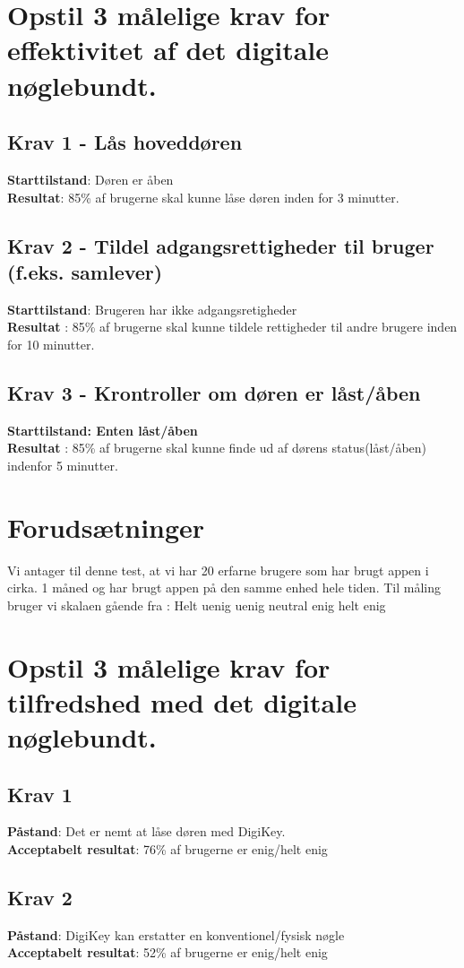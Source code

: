 \documentclass[12pt]{article}
\begin{document}
\section*{Opstil 3 målelige krav for effektivitet af det digitale nøglebundt.}
\subsection*{Krav 1 - Lås hoveddøren}
\textbf{Starttilstand}: Døren er åben\\
\textbf{Resultat}: 85\% af brugerne skal kunne låse døren inden for 3 minutter.
\subsection*{Krav 2 - Tildel adgangsrettigheder til bruger (f.eks. samlever)}
\textbf{Starttilstand}: Brugeren har ikke adgangsretigheder\\
\textbf{Resultat} : 85\% af brugerne skal kunne tildele rettigheder til andre brugere inden for 10 minutter.
\subsection*{Krav 3 - Krontroller om døren er låst/åben}
\textbf{Starttilstand: Enten l\aa st/\aa ben}\\
\textbf{Resultat} : 85\% af brugerne skal kunne finde ud af dørens status(låst/åben) indenfor 5 minutter.\newpage
\section*{Forudsætninger}
Vi antager til denne test, at vi har 20 erfarne brugere som har brugt appen i cirka. 1 måned og har brugt appen på den samme enhed hele tiden.
Til måling bruger vi skalaen gående fra : Helt uenig uenig neutral enig helt enig\\
\section*{Opstil 3 målelige krav for tilfredshed med det digitale nøglebundt.}
\subsection*{Krav 1}
\textbf{Påstand}: Det er nemt at låse døren med DigiKey.\\
\textbf{Acceptabelt resultat}: 76\% af brugerne er enig/helt enig
\subsection*{Krav 2}
\textbf{Påstand}: DigiKey kan erstatter en konventionel/fysisk nøgle\\
\textbf{Acceptabelt resultat}: 52\% af brugerne er enig/helt enig
\end{document}

